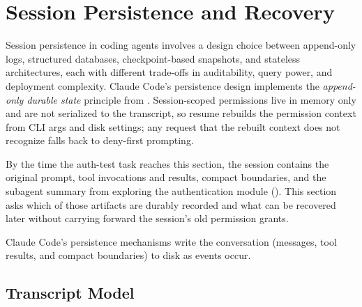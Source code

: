 \section{Session Persistence and Recovery}
\label{sec:persist}

Session persistence in coding agents involves a design choice between append-only logs, structured databases, checkpoint-based snapshots, and stateless architectures, each with different trade-offs in auditability, query power, and deployment complexity. Claude Code's persistence design implements the \emph{append-only durable state} principle from . Session-scoped permissions live in memory only and are not serialized to the transcript, so resume rebuilds the permission context from CLI args and disk settings; any request that the rebuilt context does not recognize falls back to deny-first prompting.

By the time the auth-test task reaches this section, the session contains the original prompt, tool invocations and results, compact boundaries, and the subagent summary from exploring the authentication module (). This section asks which of those artifacts are durably recorded and what can be recovered later without carrying forward the session's old permission grants.

Claude Code's persistence mechanisms write the conversation (messages, tool results, and compact boundaries) to disk as events occur.

\subsection{Transcript Model}
\label{sec:persist:transcript}


